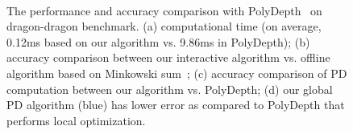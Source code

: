 \begin{figure}[htb]
  \centering
  \\
  \caption[The performance and accuracy comparison between learning-based PD algorithm and PolyDepth on dragon-dragon benchmark]{The performance and accuracy comparison with PolyDepth~\protect\cite{Je:2012:PRP} on dragon-dragon benchmark. (a) computational time (on average, 0.12ms based on our algorithm vs. 9.86ms in PolyDepth); (b) accuracy comparison between our interactive algorithm vs. offline algorithm based on Minkowski sum~\protect\cite{Lien:2009:ASM}; (c) accuracy comparison of PD computation between our algorithm vs. PolyDepth; (d) our global PD algorithm (blue) has lower error as compared to PolyDepth that performs local optimization.}\label{fig:2:dragonmodels}
\end{figure}



